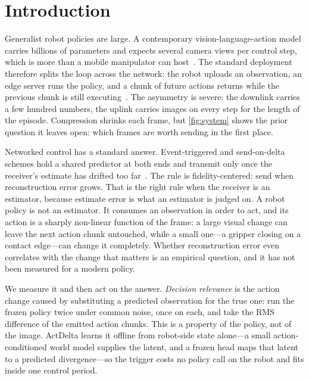 \documentclass[sigconf,10pt,anonymous,review]{acmart}
\begin{document}

\maketitle

\section{Introduction}

Generalist robot policies are large. A contemporary vision-language-action
model carries billions of parameters and expects several camera views per
control step, which is more than a mobile manipulator can
host~\cite{black2024pi0,kim2024openvla,pi2025pi05}. The standard deployment
therefore splits the loop across the network: the robot uploads an
observation, an edge server runs the policy, and a chunk of future actions
returns while the previous chunk is still
executing~\cite{cao2026edgeserving,dai2025actionflow,julg2026vlagents,li2026oxygen,peng2026latency}.
The asymmetry is severe: the downlink carries a few hundred numbers, the
uplink carries images on every step for the length of the episode.
Compression shrinks each frame, but \cref{fig:system} shows the prior question it
leaves open: which frames are worth sending in the first place.

Networked control has a standard answer. Event-triggered and send-on-delta
schemes hold a shared predictor at both ends and transmit only once the
receiver's estimate has drifted too
far~\cite{jiang2025semworld,miskowicz2006sod,nguyen2008area,suh2007linear}.
The rule is fidelity-centered: send when reconstruction error grows. That is
the right rule when the receiver is an estimator, because estimate error is
what an estimator is judged on. A robot policy is not an estimator. It
consumes an observation in order to act, and its action is a sharply
non-linear function of the frame: a large visual change can leave the next
action chunk untouched, while a small one---a gripper closing on a contact
edge---can change it completely. Whether reconstruction error even correlates
with the change that matters is an empirical question, and it has not been
measured for a modern policy.

We measure it and then act on the answer. \emph{Decision relevance} is the
action change caused by substituting a predicted observation for the true
one: run the frozen policy twice under common noise, once on each, and take
the RMS difference of the emitted action chunks. This is a property of the
policy, not of the image. ActDelta learns it offline from robot-side state
alone---a small action-conditioned world model supplies the latent, and a
frozen head maps that latent to a predicted divergence---so the trigger costs
no policy call on the robot and fits inside one control period.
\end{document}
